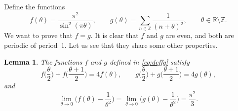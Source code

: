 \documentclass[11pt, oneside]{article}
\newcommand{\Z}{\mathbb{Z}}
\newcommand{\R}{\mathbb{R}}
\theoremstyle{plain}
\newtheorem{lemma}[theorem]{Lemma}
\theoremstyle{definition}
\begin{document}
Define the functions
\begin{equation}
\label{eq:deffg}
  f(\theta) = \frac{\pi^2}{\sin^2(\pi\theta)},
  \qquad 
  g(\theta) = \sum_{n\in\Z} \frac{1}{(n+\theta)^2},
  \qquad \theta \in \R \setminus \Z.
\end{equation}
We want to prove that $f=g$. It is clear that $f$ and $g$ are even, and both are periodic of period~$1$. Let us see that they share some other properties.

\begin{lemma}
\label{lem:fg}
The functions $f$ and $g$ defined in \eqref{eq:deffg} satisfy
\begin{equation}
\label{eq:eqfunfg}
  f\Big(\frac{\theta}{2}\Big) + f\Big(\frac{\theta+1}{2}\Big) = 4f(\theta),
  \qquad
  g\Big(\frac{\theta}{2}\Big) + g\Big(\frac{\theta+1}{2}\Big) = 4g(\theta),
\end{equation}
and
\begin{equation}
\label{eq:lim0fg}
  \lim_{\theta\to0} \Big( f(\theta) - \frac{1}{\theta^2} \Big)
  = \lim_{\theta\to0} \Big( g(\theta) - \frac{1}{\theta^2} \Big)
  = \frac{\pi^2}{3}.
\end{equation}
\end{lemma}
\end{document}
